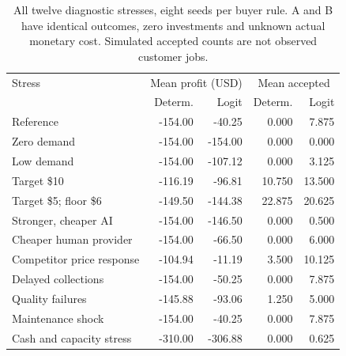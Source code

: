 \begin{table}[htbp]
\centering\small
\begin{tabularx}{\textwidth}{Xrrrr}
\toprule
Stress & \multicolumn{2}{c}{Mean profit (USD)} & \multicolumn{2}{c}{Mean accepted}\\
 & Determ. & Logit & Determ. & Logit\\
\midrule
Reference & -154.00 & -40.25 & 0.000 & 7.875\\
Zero demand & -154.00 & -154.00 & 0.000 & 0.000\\
Low demand & -154.00 & -107.12 & 0.000 & 3.125\\
Target \$10 & -116.19 & -96.81 & 10.750 & 13.500\\
Target \$5; floor \$6 & -149.50 & -144.38 & 22.875 & 20.625\\
Stronger, cheaper AI & -154.00 & -146.50 & 0.000 & 0.500\\
Cheaper human provider & -154.00 & -66.50 & 0.000 & 6.000\\
Competitor price response & -104.94 & -11.19 & 3.500 & 10.125\\
Delayed collections & -154.00 & -50.25 & 0.000 & 7.875\\
Quality failures & -145.88 & -93.06 & 1.250 & 5.000\\
Maintenance shock & -154.00 & -40.25 & 0.000 & 7.875\\
Cash and capacity stress & -310.00 & -306.88 & 0.000 & 0.625\\
\bottomrule
\end{tabularx}
\caption{All twelve diagnostic stresses, eight seeds per buyer rule. A and B have identical outcomes, zero investments and unknown actual monetary cost. Simulated accepted counts are not observed customer jobs.}
\end{table}
